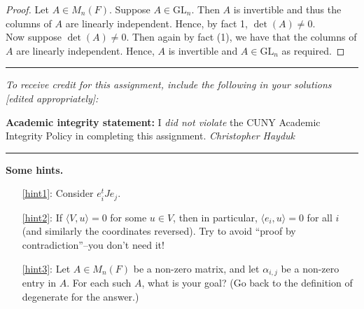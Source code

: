 \documentclass[11pt, reqno]{amsart}
\theoremstyle{plain}
\theoremstyle{definition}
\theoremstyle{example}
\def\GL{\mathrm{GL}} \def\SL{\mathrm{SL}}  \def\SP{\mathrm{SL}}
\def\<{\langle} \def\>{\rangle}
\begin{document}
\begin{enumerate}[1.]
\begin{enumerate}[(a)]
\begin{proof}
Let $A \in M_n(F)$. Suppose $A \in \GL_n$. Then $A$ is invertible and thus the columns of $A$ are linearly independent. Hence, by fact 1, $\det(A) \neq 0$.\\

Now suppose $\det(A) \neq 0$. Then again by fact (1), we have that the columns of $A$ are linearly independent. Hence, $A$ is invertible and $A \in \GL_n$ as required.
\end{proof}
\end{enumerate}
\end{enumerate}

\vfill


\hrule
\emph{\small To receive credit for this assignment, include the following in your solutions [edited appropriately]:}

\smallskip

\textbf{Academic integrity statement:} I \emph{did not violate} the CUNY Academic Integrity Policy in completing this assignment. \hfill \emph{Christopher Hayduk}

\medskip
\hrule

\vfill

\pagebreak

\textbf{Some hints.}
\begin{enumerate}
\item[\ref{hint1}:] Consider $e_i^t J e_j$.
\item[\ref{hint2}:] If $\<V,u\>=0$ for some $u \in V$, then in particular, $\<e_i, u\>=0$ for all $i$ (and similarly the coordinates reversed). Try to avoid ``proof by contradiction''--you don't need it! 
\item[\ref{hint3}:] Let $A \in M_n(F)$ be a non-zero matrix, and let $\alpha_{i,j}$ be a non-zero entry in $A$. For each such $A$, what is your goal? (Go back to the definition of degenerate for the answer.)
\end{enumerate}
\end{document}
